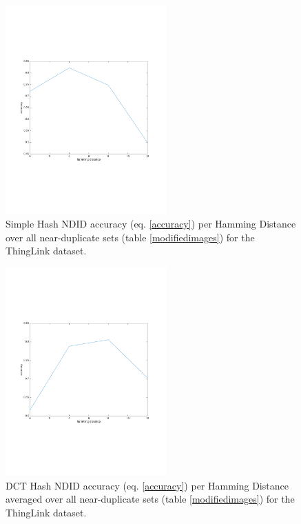 \documentclass[english,12pt,a4paper,pdftex,elec,utf8, table]{aaltothesis}
\begin{document}
\begin{figure}[htb]
\begin{center}
\includegraphics[height=8cm]{figures/thinglink_simpleTotalAccuracy}
\end{center}
\caption{Simple Hash NDID accuracy (eq. \ref{accuracy}) per Hamming Distance over all near-duplicate sets (table \ref{modifiedimages}) for the ThingLink dataset.}
\label{thinglinksimpletotalaccuracy}
\end{figure}

\begin{figure}[htb]
\begin{center}
\includegraphics[height=8cm]{figures/thinglink_dctTotalAccuracy}
\end{center}
\caption{DCT Hash NDID accuracy (eq. \ref{accuracy}) per Hamming Distance averaged over all near-duplicate sets (table \ref{modifiedimages}) for the ThingLink dataset.}
\label{thinglinkdcttotalaccuracy}
\end{figure}

\clearpage
\end{document}
